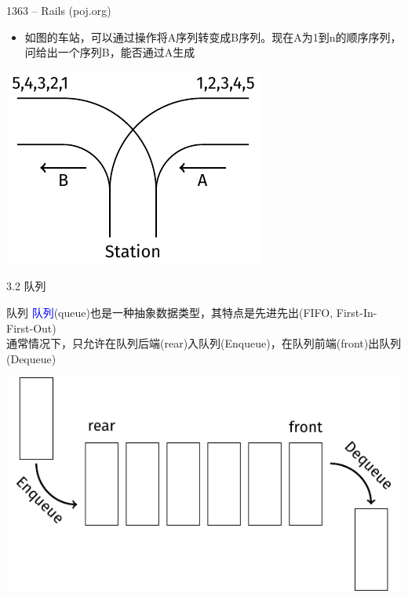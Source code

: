 \begin{frame}{1363 -- Rails (poj.org)}
    \begin{itemize}
        \item 如图的车站，可以通过操作将A序列转变成B序列。现在A为1到n的顺序序列，问给出一个序列B，能否通过A生成
    \end{itemize}
    \vfill
    \includegraphics[center]{fig/3-2.pdf}
\end{frame}
\begin{frame}{3.2 队列}
    \begin{block}{队列}
        \textcolor{blue}{队列}(queue)也是一种抽象数据类型，其特点是先进先出(FIFO, First-In-First-Out) \\ 通常情况下，只允许在队列后端(rear)入队列(Enqueue)，在队列前端(front)出队列(Dequeue)
    \end{block}
    \vfill
    \includegraphics[scale=.8,center]{fig/3-3.pdf}
\end{frame}
